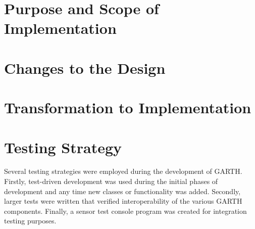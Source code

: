 \documentclass{article}
\begin{document}

\tableofcontents
\listoffigures

\section{Purpose and Scope of Implementation} %


\section{Changes to the Design} %

\section{Transformation to Implementation} %

\section{Testing Strategy} %

Several testing strategies were employed during the development of
GARTH. Firstly, test-driven development was used during the initial
phases of development and any time new classes or functionality was
added. Secondly, larger tests were written that verified
interoperability of the various GARTH components. Finally, a sensor
test console program was created for integration testing purposes.
\end{document}
